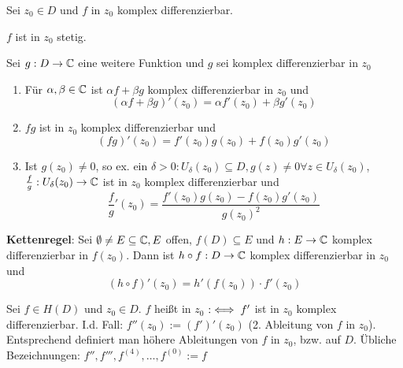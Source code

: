 \documentclass[a4paper,twoside,DIV15,BCOR12mm]{scrbook}
\def\gdw{\equizu}
\def\gdw{\equizu}
\begin{document}
\begin{satz}
Sei $z_0 \in D$ und $f$ in $z_0$ komplex differenzierbar.
\begin{liste}
\item $f$ ist in $z_0$ stetig.
\item Sei $g: D \rightarrow \mathbb{C}$ eine weitere Funktion und $g$ sei komplex differenzierbar in $z_0$
\begin{enumerate}
\item Für $\alpha ,\beta \in \mathbb{C}$ ist $\alpha f+\beta g$ komplex differenzierbar in $z_0$ und 
$$(\alpha f+\beta g)'(z_0) = \alpha f'(z_0) + \beta g'(z_0)$$
\item $fg$ ist in $z_0$ komplex differenzierbar und 
$$(fg)'(z_0) = f'(z_0)g(z_0) + f(z_0)g'(z_0)$$
\item Ist $g(z_0) \neq 0$, so ex. ein $\delta > 0: U_\delta (z_0) \subseteq D, g(z) \neq 0 \forall z \in U_\delta (z_0)$, \\
$\frac{f}{g}: U_\delta (z_0) \rightarrow \mathbb{C}$ ist in $z_0$ komplex differenzierbar und 
$$\frac{f}{g}'(z_0) = \frac{f'(z_0)g(z_0) - f(z_0)g'(z_0)}{g(z_0)^2}$$
\end{enumerate}
\item \textbf{Kettenregel}: Sei $\emptyset \neq E \subseteq \mathbb{C}, E$ offen, $f(D) \subseteq E$ und $h: E \rightarrow \mathbb{C}$ komplex differenzierbar in $f(z_0)$. Dann ist $h\circ f: D \rightarrow \mathbb{C}$ komplex differenzierbar in $z_0$ und 
$$(h\circ f)'(z_0) = h'(f(z_0))\cdot f'(z_0)$$
\end{liste}
\end{satz}

\begin{definition}
Sei $f \in H(D)$ und $z_0 \in D$. $f$ heißt in $z_0$  $:\gdw f'$ ist in $z_0$ komplex differenzierbar. I.d. Fall: $f''(z_0):=(f')'(z_0)$ (2. Ableitung von $f$ in $z_0$). Entsprechend definiert man höhere Ableitungen von $f$ in $z_0$, bzw. auf $D$. Übliche Bezeichnungen: $f'', f''', f^{(4)},\ldots,f^{(0)}:=f$
\end{definition}
\end{document}
